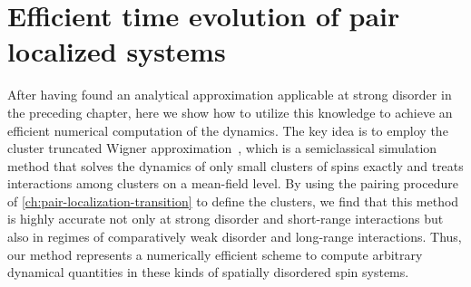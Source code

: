 \chapter{Efficient time evolution of pair localized systems}\label{ch:cTWA-paper}

After having found an analytical approximation applicable at strong disorder in the preceding chapter, here we show how to utilize this knowledge to achieve an efficient numerical computation of the dynamics. The key idea is to employ the cluster truncated Wigner approximation~\cite{wurtzClusterTruncatedWigner2018}, which is a semiclassical simulation method that solves the dynamics of only small clusters of spins exactly and treats interactions among clusters on a mean-field level. By using the pairing procedure of \autoref{ch:pair-localization-transition} to define the clusters, we find that this method is highly accurate not only at strong disorder and short-range interactions but also in regimes of comparatively weak disorder and long-range interactions. 
Thus, our method represents a numerically efficient scheme to compute arbitrary dynamical quantities in these kinds of spatially disordered spin systems.

\newpage
{}
